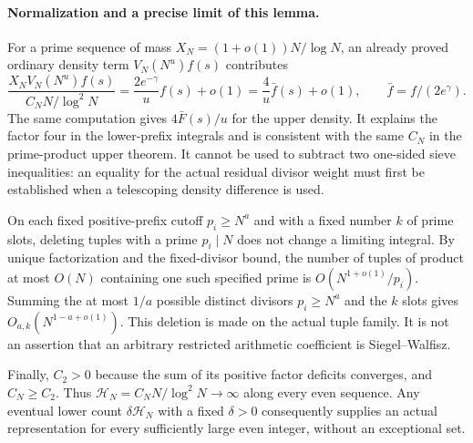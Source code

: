 \paragraph{Normalization and a precise limit of this lemma.}
For a prime sequence of mass $X_N=(1+o(1))N/\log N$, an already
proved ordinary density term $V_N(N^u)f(s)$ contributes
\[
 \frac{X_NV_N(N^u)f(s)}{C_NN/\log^2N}
 =\frac{2e^{-\gamma}}u f(s)+o(1)
 =\frac4u\bar f(s)+o(1),
 \qquad \bar f=f/(2e^\gamma).
\]
The same computation gives $4\bar F(s)/u$ for the upper density.
It explains the factor four in the lower-prefix integrals and is
consistent with the same $C_N$ in the prime-product upper theorem.
It cannot be used to subtract two one-sided sieve inequalities:
an equality for the actual residual divisor weight must first be
established when a telescoping density difference is used.

On each fixed positive-prefix cutoff $p_i\ge N^a$ and with a fixed
number $k$ of prime slots, deleting tuples with a prime $p_i\mid N$
does not change a limiting integral.  By unique factorization and
the fixed-divisor bound, the number of tuples of product at most
$O(N)$ containing one such specified prime is
$O(N^{1+o(1)}/p_i)$.  Summing the at most $1/a$ possible distinct
divisors $p_i\ge N^a$ and the $k$ slots gives
$O_{a,k}(N^{1-a+o(1)})$.  This deletion is made on the actual
tuple family.  It is not an assertion that an arbitrary restricted
arithmetic coefficient is Siegel--Walfisz.

Finally, $C_2>0$ because the sum of its positive factor deficits
converges, and $C_N\ge C_2$.  Thus
$\mathcal H_N=C_NN/\log^2N\to\infty$ along every even sequence.
Any eventual lower count $\delta\mathcal H_N$ with a fixed
$\delta>0$ consequently supplies an actual representation for
every sufficiently large even integer, without an exceptional set.

